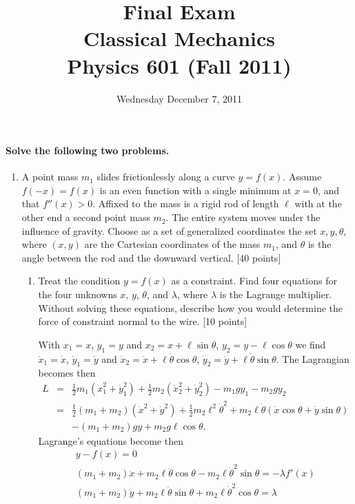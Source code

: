 \documentclass[letterpaper,11pt]{article}
\title{Final Exam \\ Classical Mechanics \\ Physics 601 (Fall 2011)}
\date{Wednesday December 7, 2011}
\begin{document}
\maketitle

\paragraph{Solve the following two problems.}
\begin{enumerate}
 \item A point mass $m_1$ slides frictionlessly along a curve $y = f(x)$.  Assume $f(-x) = f(x)$ is an even function with a single minimum at $x = 0$, and that $f''(x) > 0$.  Affixed to the mass is a rigid rod of length $\ell$ with at the other end a second point mass $m_2$.  The entire system moves under the influence of gravity.  Choose as a set of generalized coordinates the set ${x,y,\theta}$, where $(x,y)$ are the Cartesian coordinates of the mass $m_1$, and $\theta$ is the angle between the rod and the downward vertical. [40 points]
 \begin{enumerate}
  \item Treat the condition $y = f(x)$ as a constraint.  Find four equations for the four unknowns $x$, $y$, $\theta$, and $\lambda$, where $\lambda$ is the Lagrange multiplier.  Without solving these equations, describe how you would determine the force of constraint normal to the wire. [10 points]

  With $x_1 = x$, $y_1 = y$ and $x_2 = x + \ell\sin\theta$, $y_2 = y - \ell\cos\theta$ we find $\dot{x}_1 = \dot{x}$, $\dot{y}_1 = \dot{y}$ and $\dot{x}_2 = \dot{x} + \ell\dot{\theta}\cos\theta$, $\dot{y}_2 = \dot{y} + \ell\dot{\theta}\sin\theta$.  The Lagrangian becomes then
   \begin{eqnarray*}
    L & = & \frac{1}{2} m_1 (\dot{x}_1^2 + \dot{y}_1^2) + \frac{1}{2} m_2 (\dot{x}_2^2 + \dot{y}_2^2) - m_1 g y_1 - m_2 g y_2 \\
      & = & \frac{1}{2} (m_1 + m_2) (\dot{x}^2 + \dot{y}^2) + \frac{1}{2} m_2 \ell^2\dot{\theta}^2 + m_2 \ell\dot{\theta} (\dot{x}\cos\theta + \dot{y}\sin\theta) \\
      &   & - (m_1 + m_2) g y + m_2 g \ell\cos\theta.
   \end{eqnarray*}
  Lagrange's equations become then
   \begin{eqnarray*}
    y - f(x) = 0 \\
    (m_1 + m_2) \ddot{x} + m_2\ell\ddot{\theta}\cos\theta - m_2\ell\dot{\theta}^2\sin\theta = -\lambda f'(x) \\
    (m_1 + m_2) \ddot{y} + m_2\ell\ddot{\theta}\sin\theta + m_2\ell\dot{\theta}^2\cos\theta = \lambda \\


\end{eqnarray*}
\end{enumerate}
\end{enumerate}
\end{document}
